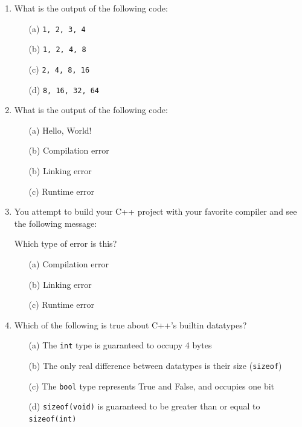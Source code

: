 \documentclass{article}
\begin{document}
\begin{enumerate}
\item What is the output of the following code:

\begin{itemize}
	\item[(a)] \texttt{1, 2, 3, 4}
	\item[(b)] {\texttt{1, 2, 4, 8}}
	\item[(c)] \texttt{2, 4, 8, 16}
	\item[(d)] \texttt{8, 16, 32, 64} 
\end{itemize}

\item What is the output of the following code:






\begin{itemize}
	\item[(a)] Hello, World!
	\item[(b)] Compilation error
	\item[(b)] Linking error
	\item[(c)] Runtime error 
\end{itemize}

\pagebreak

\item You attempt to build your C++ project with your favorite compiler and see the following message:



\noindent
Which type of error is this?

\begin{itemize}
	\item[(a)] Compilation error
	\item[(b)] {Linking error}
	\item[(c)] Runtime error
\end{itemize}

\item Which of the following is true about C++'s builtin datatypes?

\begin{itemize}
	\item[(a)] The \texttt{int} type is guaranteed to occupy 4 bytes
	\item[(b)] The only real difference between datatypes is their size (\texttt{sizeof})
	\item[(c)] The \texttt{bool} type represents True and False, and occupies one bit
	\item[(d)] \texttt{sizeof(void)} is guaranteed to be greater than or equal to \texttt{sizeof(int)}
\end{itemize}

\end{enumerate}
\end{document}
